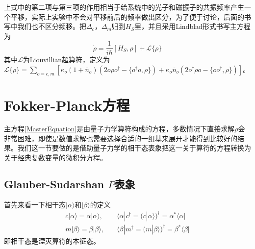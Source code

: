 上式中的第二项与第三项的作用相当于给系统中的光子和磁振子的共振频率产生一个平移，实际上实验中不会对平移前后的频率做出区分，为了便于讨论，后面的书写中我们也不区分频移。把$\Delta_c$，$\Delta_m$归到$H_S$里，并且采用Lindblad形式书写主方程为
\begin{equation}
\dot{\rho}=\frac{1}{i\hbar}[H_S,\rho]+\mathcal{L}\{\rho\}
\label{MasterEquation}
\end{equation}
其中$\mathcal{L}$为Liouvillian超算符，定义为$\mathcal{L}\{\rho\}=\sum\limits_{o=c,m}[\kappa_{o}(1 +\overline{n}_{o})(2o\rho o^{\dag}-\{o^{\dag}o,\rho\}) +\kappa_{o} \overline{n}_{o} (2o^{\dag}\rho o-\{oo^{\dag},\rho\})]$。

\section{Fokker-Planck方程}
\label{sec3.2}
主方程\eqref{MasterEquation}是由量子力学算符构成的方程，多数情况下直接求解$\rho$会非常困难，即使是数值求解也需要选择合适的一组基来展开才能得到比较好的结果。我们这一节要做的是借助量子力学的相干态表象把这一关于算符的方程转换为关于经典复数变量的微积分方程。

\subsection{Glauber-Sudarshan $P$表象}
首先来看一下相干态$|\alpha\rangle$和$|\beta\rangle$的定义
\begin{equation}
\begin{aligned}
c|\alpha\rangle=\alpha|\alpha\rangle,& \quad\langle\alpha| c^{\dagger}=(c|\alpha\rangle)^{\dagger}=\alpha^{*}\langle\alpha| \\
m|\beta\rangle=\beta|\beta\rangle,& \quad\langle\beta| m^{\dagger}=(m|\beta\rangle)^{\dagger}=\beta^{*}\langle\beta|
\end{aligned}
\end{equation}
即相干态是湮灭算符的本征态。


